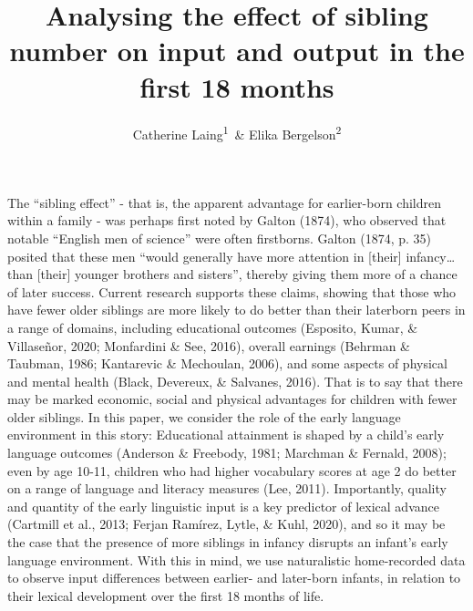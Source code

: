 \documentclass[man,floatsintext]{apa6}
\title{Analysing the effect of sibling number on input and output in the first 18 months}
\author{Catherine Laing\textsuperscript{1}~\& Elika Bergelson\textsuperscript{2}}
\date{}
\affiliation{
\vspace{0.5cm}
\textsuperscript{1} Cardiff University, Cardiff, UK\\\textsuperscript{2} Duke University, Durham, NC, USA}
\begin{document}
\maketitle

The \enquote{sibling effect} - that is, the apparent advantage for earlier-born children within a family - was perhaps first noted by Galton (1874), who observed that notable \enquote{English men of science} were often firstborns. Galton (1874, p. 35) posited that these men \enquote{would generally have more attention in {[}their{]} infancy\ldots{}than {[}their{]} younger brothers and sisters}, thereby giving them more of a chance of later success. Current research supports these claims, showing that those who have fewer older siblings are more likely to do better than their laterborn peers in a range of domains, including educational outcomes (Esposito, Kumar, \& Villaseñor, 2020; Monfardini \& See, 2016), overall earnings (Behrman \& Taubman, 1986; Kantarevic \& Mechoulan, 2006), and some aspects of physical and mental health (Black, Devereux, \& Salvanes, 2016). That is to say that there may be marked economic, social and physical advantages for children with fewer older siblings. In this paper, we consider the role of the early language environment in this story: Educational attainment is shaped by a child's early language outcomes (Anderson \& Freebody, 1981; Marchman \& Fernald, 2008); even by age 10-11, children who had higher vocabulary scores at age 2 do better on a range of language and literacy measures (Lee, 2011). Importantly, quality and quantity of the early linguistic input is a key predictor of lexical advance (Cartmill et al., 2013; Ferjan Ramírez, Lytle, \& Kuhl, 2020), and so it may be the case that the presence of more siblings in infancy disrupts an infant's early language environment. With this in mind, we use naturalistic home-recorded data to observe input differences between earlier- and later-born infants, in relation to their lexical development over the first 18 months of life.
\end{document}

